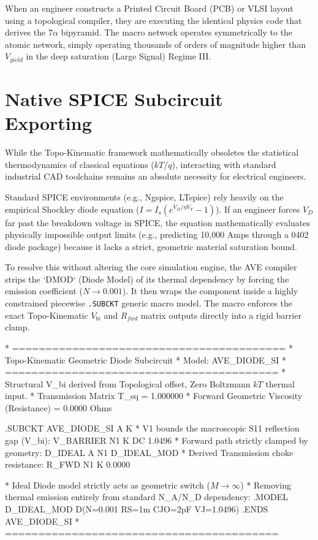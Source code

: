 When an engineer constructs a Printed Circuit Board (PCB) or VLSI layout using a topological compiler, they are executing the identical physics code that derives the $7\alpha$ bipyramid. The macro network operates symmetrically to the atomic network, simply operating thousands of orders of magnitude higher than $V_{yield}$ in the deep saturation (Large Signal) Regime III.

\section{Native SPICE Subcircuit Exporting}
While the Topo-Kinematic framework mathematically obsoletes the statistical thermodynamics of classical equations ($kT/q$), interacting with standard industrial CAD toolchains remains an absolute necessity for electrical engineers.

Standard SPICE environments (e.g., Ngspice, LTspice) rely heavily on the empirical Shockley diode equation ($I = I_s \left( e^{V_D / \eta V_T} - 1 \right)$). If an engineer forces $V_D$ far past the breakdown voltage in SPICE, the equation mathematically evaluates physically impossible output limits (e.g., predicting 10,000 Amps through a 0402 diode package) because it lacks a strict, geometric material saturation bound.

To resolve this without altering the core simulation engine, the AVE compiler strips the `DMOD` (Diode Model) of its thermal dependency by forcing the emission coefficient ($N \to 0.001$). It then wraps the component inside a highly constrained piecewise \texttt{.SUBCKT} generic macro model. The macro enforces the exact Topo-Kinematic $V_{bi}$ and $R_{fwd}$ matrix outputs directly into a rigid barrier clamp.

\begin{codebox}
* =========================================
* Topo-Kinematic Geometric Diode Subcircuit
* Model: AVE\_DIODE\_SI
* =========================================
* Structural V\_bi derived from Topological offset, Zero Boltzmann $kT$ thermal input.
* Transmission Matrix T\_sq = 1.000000
* Forward Geometric Viscosity (Resistance) = 0.0000 Ohms

.SUBCKT AVE\_DIODE\_SI A K
* V1 bounds the macroscopic S11 reflection gap (V\_bi):
V\_BARRIER N1 K DC 1.0496
* Forward path strictly clamped by geometry:
D\_IDEAL A N1 D\_IDEAL\_MOD
* Derived Transmission choke resistance:
R\_FWD N1 K 0.0000

* Ideal Diode model strictly acts as geometric switch ($M \to \infty$)
* Removing thermal emission entirely from standard N\_A/N\_D dependency:
.MODEL D\_IDEAL\_MOD D(N=0.001 RS=1m CJO=2pF VJ=1.0496)
.ENDS AVE\_DIODE\_SI
* =========================================
\end{codebox}

